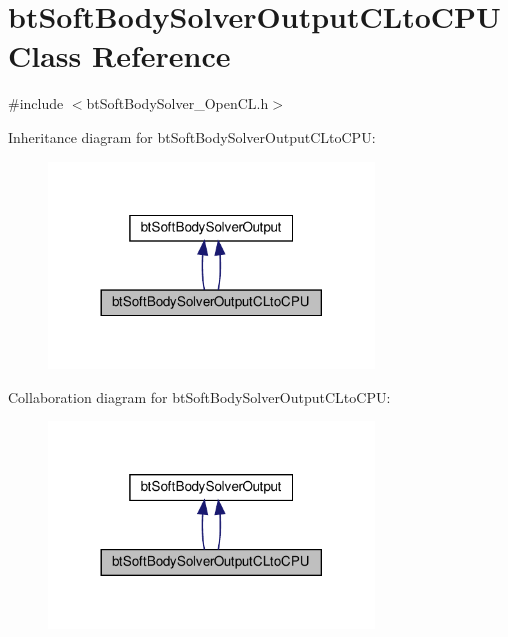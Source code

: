 \hypertarget{classbtSoftBodySolverOutputCLtoCPU}{}\section{bt\+Soft\+Body\+Solver\+Output\+C\+Lto\+C\+PU Class Reference}
\label{classbtSoftBodySolverOutputCLtoCPU}


{\ttfamily \#include $<$bt\+Soft\+Body\+Solver\+\_\+\+Open\+C\+L.\+h$>$}



Inheritance diagram for bt\+Soft\+Body\+Solver\+Output\+C\+Lto\+C\+PU\+:
\nopagebreak
\begin{figure}[H]
\begin{center}
\leavevmode
\includegraphics[width=245pt]{classbtSoftBodySolverOutputCLtoCPU__inherit__graph}
\end{center}
\end{figure}


Collaboration diagram for bt\+Soft\+Body\+Solver\+Output\+C\+Lto\+C\+PU\+:
\nopagebreak
\begin{figure}[H]
\begin{center}
\leavevmode
\includegraphics[width=245pt]{classbtSoftBodySolverOutputCLtoCPU__coll__graph}
\end{center}
\end{figure}
